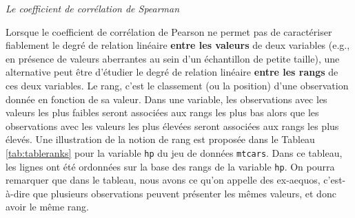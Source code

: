 \documentclass[
  french,
]{book}
\begin{document}
\emph{Le coefficient de corrélation de Spearman}

Lorsque le coefficient de corrélation de Pearson ne permet pas de caractériser fiablement le degré de relation linéaire \textbf{entre les valeurs} de deux variables (e.g., en présence de valeurs aberrantes au sein d'un échantillon de petite taille), une alternative peut être d'étudier le degré de relation linéaire \textbf{entre les rangs} de ces deux variables. Le rang, c'est le classement (ou la position) d'une observation donnée en fonction de sa valeur. Dans une variable, les observations avec les valeurs les plus faibles seront associées aux rangs les plus bas alors que les observations avec les valeurs les plus élevées seront associées aux rangs les plus élevés. Une illustration de la notion de rang est proposée dans le Tableau \ref{tab:tableranks} pour la variable \texttt{hp} du jeu de données \texttt{mtcars}. Dans ce tableau, les lignes ont été ordonnées sur la base des rangs de la variable \texttt{hp}. On pourra remarquer que dans le tableau, nous avons ce qu'on appelle des ex-aequos, c'est-à-dire que plusieurs observations peuvent présenter les mêmes valeurs, et donc avoir le même rang.

\providecommand{\docline}[3]{\noalign{\global\setlength{\arrayrulewidth}{#1}}\arrayrulecolor[HTML]{#2}\cline{#3}}

\setlength{\tabcolsep}{2pt}

\renewcommand*{\arraystretch}{1.5}
\end{document}

